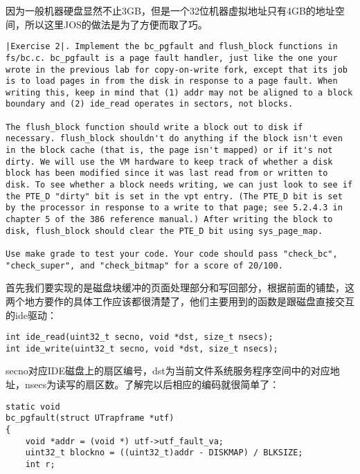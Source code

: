 \documentclass{article}
\begin{document}
\begin{CJK*}{UTF8}{gkai}
因为一般机器硬盘显然不止3GB，但是一个32位机器虚拟地址只有4GB的地址空间，所以这里JOS的做法是为了方便而取了巧。

\vspace{3em}

\begin{lstlisting}[style=exercise]
|Exercise 2|. Implement the bc_pgfault and flush_block functions in fs/bc.c. bc_pgfault is a page fault handler, just like the one your wrote in the previous lab for copy-on-write fork, except that its job is to load pages in from the disk in response to a page fault. When writing this, keep in mind that (1) addr may not be aligned to a block boundary and (2) ide_read operates in sectors, not blocks.

The flush_block function should write a block out to disk if necessary. flush_block shouldn't do anything if the block isn't even in the block cache (that is, the page isn't mapped) or if it's not dirty. We will use the VM hardware to keep track of whether a disk block has been modified since it was last read from or written to disk. To see whether a block needs writing, we can just look to see if the PTE_D "dirty" bit is set in the vpt entry. (The PTE_D bit is set by the processor in response to a write to that page; see 5.2.4.3 in chapter 5 of the 386 reference manual.) After writing the block to disk, flush_block should clear the PTE_D bit using sys_page_map.

Use make grade to test your code. Your code should pass "check_bc", "check_super", and "check_bitmap" for a score of 20/100.
\end{lstlisting}

首先我们要实现的是磁盘块缓冲的页面处理部分和写回部分，根据前面的铺垫，这两个地方要作的具体工作应该都很清楚了，他们主要用到的函数是跟磁盘直接交互的ide驱动：

\begin{lstlisting}[style=ccode]
int ide_read(uint32_t secno, void *dst, size_t nsecs);
int ide_write(uint32_t secno, void *dst, size_t nsecs);
\end{lstlisting}

secno对应IDE磁盘上的扇区编号，dst为当前文件系统服务程序空间中的对应地址，nsecs为读写的扇区数。了解完以后相应的编码就很简单了：

\begin{lstlisting}[style=ccode, title={\scriptsize \ttfamily \bfseries fc/bc.c}]
static void
bc_pgfault(struct UTrapframe *utf)
{
	void *addr = (void *) utf->utf_fault_va;
	uint32_t blockno = ((uint32_t)addr - DISKMAP) / BLKSIZE;
	int r;


\end{lstlisting}
\end{CJK*}
\end{document}
